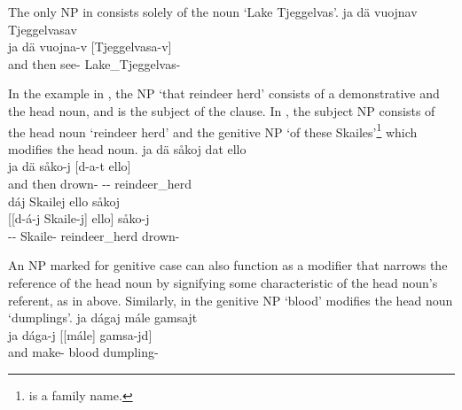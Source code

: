 The only NP in  consists solely of the noun  ‘Lake Tjeggelvas’. 
\ea\label{NPstructureEx0}%
\glll	ja dä vuojnav Tjeggelvasav\\
	ja dä vuojna-v [Tjeggelvasa-v]\subNP\\
	and then see- Lake\_Tjeggelvas-\\\nopagebreak
{}	
\z

In the example in , the NP  ‘that reindeer herd’ consists of a demonstrative and the head noun, and is the subject of the clause. 
In , the subject NP consists of the head noun  ‘reindeer herd’ and the genitive NP  ‘of these Skailes’\footnote{ is a family name.} 
which modifies the head noun. 
\ea\label{NPstructureEx1}%
\glll	ja dä såkoj dat ello\\
	ja dä såko-j [d-a-t ello]\subNP \\
	and then drown- -- reindeer\_herd\BS{}\\\nopagebreak
{}	
\z
\ea\label{NPstructureEx2}%
\glll	dáj Skailej ello såkoj\\
	[[d-á-j {Skaile-j]\subNP{}}	{ello]\subNP{}} såko-j\\
	-- Skaile- reindeer\_herd\BS{} drown-\\\nopagebreak
{}	
\z

An NP marked for genitive case can also function as a modifier that narrows the reference of the head noun by signifying some characteristic of the head noun’s referent, as in  above. Similarly, in  the genitive NP  ‘blood’ modifies the head noun  ‘dumplings’. 
\ea\label{NPstructureGenNPex1}%
\glll	ja dágaj mále gamsajt\\
	ja dága-j {[[mále]\subNP{}} {gamsa-jd]\subNP{}} \\
	and make- blood\BS{} dumpling-\\\nopagebreak
{}	
\z

